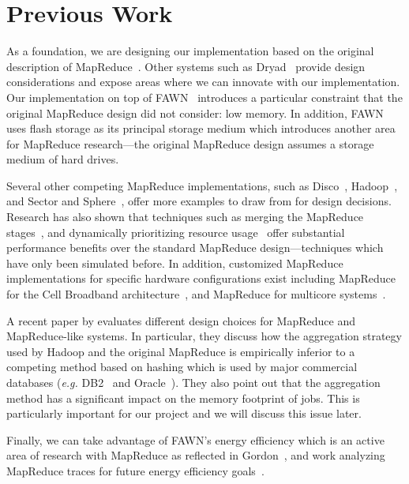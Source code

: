 \documentclass[10pt,letter,final,article,twocolumn]{article} %
\begin{document}
\section{Previous Work}

As a foundation, we are designing our implementation based on the original 
description of MapReduce~\citep{mapreduce08}.  Other systems such as
Dryad~\citep{dryad07} provide design considerations and expose areas
where we can innovate with our implementation.  Our implementation on top
of FAWN~\citep{fawn09} introduces a particular constraint that the original
MapReduce design did not consider: low memory.  In addition, FAWN uses
flash storage as its principal storage medium which introduces another
area for MapReduce research---the original MapReduce design assumes a
storage medium of hard drives.  

Several other competing MapReduce implementations, such as
Disco~\citep{disco10}, Hadoop~\citep{hadoop10}, and Sector and
Sphere~\citep{sphere09}, offer more examples to draw from for design
decisions.  Research has also shown that techniques such as merging the
MapReduce stages~\citep{barrier10}, and dynamically prioritizing resource
usage~\citep{sandholm09} offer substantial performance benefits over the
standard MapReduce design---techniques which have only been simulated
before.  In addition, customized MapReduce implementations for specific 
hardware configurations exist including MapReduce for the Cell Broadband
architecture~\citep{rafique09}, and MapReduce for multicore 
systems~\citep{chu06}.

A recent paper by \citet{yu2009distributed} evaluates different design
choices for MapReduce and MapReduce-like systems. In particular, they
discuss how the aggregation strategy used by Hadoop and the original
MapReduce is empirically inferior to a competing method based
on hashing which is used by major commercial databases (\emph{e.g.}
DB2~\citep{db210} and Oracle~\citep{oracle10}). They also point out
that the aggregation method has a significant impact on the memory
footprint of jobs. This is particularly important for our project and we will
discuss this issue later.

Finally, we can take advantage of FAWN's energy efficiency which is
an active area of research with MapReduce as reflected in
Gordon~\citep{gordon09},  and work analyzing MapReduce traces for future
energy efficiency goals~\citep{chen10}.
\end{document}
